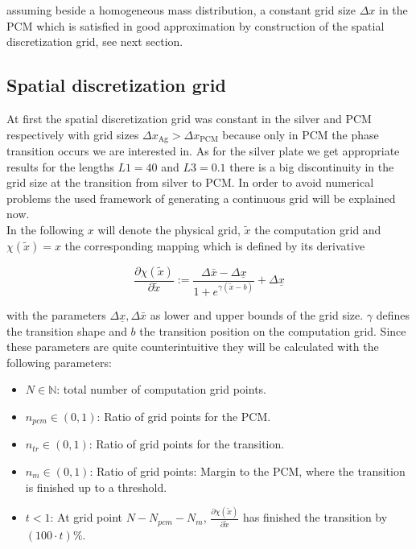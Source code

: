 \documentclass{scrartcl}[12pt, halfparskip]
\begin{document}
assuming beside a homogeneous mass distribution, a constant grid size $\Delta x$ in the PCM which is satisfied in good approximation by construction of the spatial discretization grid, see next section.


\subsection{Spatial discretization grid}
At first the spatial discretization grid was constant in the silver and PCM respectively with grid sizes $\Delta x_{\text{Ag}} > \Delta x_{\text{PCM}}$ because only in PCM the phase transition occurs we are interested in. As for the silver plate we get appropriate results for the lengths $L1=40$ and $L3=0.1$ there is a big discontinuity in the grid size at the transition from silver to PCM. In order to avoid numerical problems the used framework of generating a continuous grid will be explained now. \\
In the following $x$ will denote the physical grid, $\tilde{x}$ the computation grid and $\chi(\tilde{x}) = x$ the corresponding mapping which is defined by its derivative

\begin{equation}
	\frac{\partial \chi(\tilde{x})}{\partial \tilde{x}} := \frac{\Delta \bar{x} - \Delta \underline{x}}{1 + e^{\gamma(\tilde{x} - b)}} + \Delta \underline{x}
\end{equation}

with the parameters $\Delta \underline{x}, \Delta \bar{x}$ as lower and upper bounds of the grid size. $\gamma$ defines the transition shape and $b$ the transition position on the computation grid. Since these parameters are quite counterintuitive they will be calculated with the following parameters:

\begin{itemize}
	\item $N \in \mathbb{N}$: total number of computation grid points.
	\item $n_{pcm} \in (0,1)$: Ratio of grid points for the PCM.
	\item $n_{tr} \in (0,1)$: Ratio of grid points for the transition.
	\item $n_{m} \in (0,1)$: Ratio of grid points: Margin to the PCM, where the transition is finished up to a threshold.
	\item $t < 1$: At grid point $N-N_{pcm}-N_m$, $\frac{\partial \chi(\tilde{x})}{\partial \tilde{x}}$ has finished the transition by $(100 \cdot t)\%$.
\end{itemize}
\end{document}
